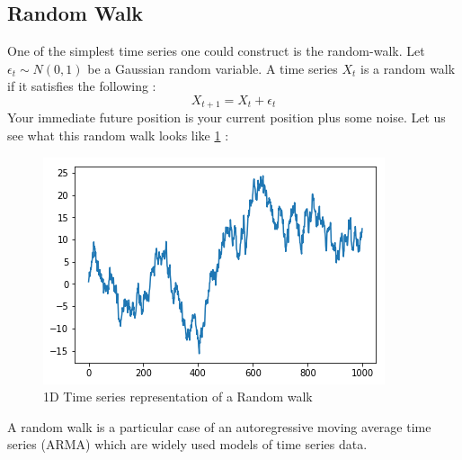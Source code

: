 \documentclass{article}
\begin{document}
\subsection{Random Walk}
One of the simplest time series one could construct is the random-walk. Let $\epsilon_{t}\sim N(0,1)$  be a Gaussian random variable. A time series $X_t$ is a random walk if it satisfies the following : 
\begin{equation}\label{rwalk}
    X_{t+1}=X_{t}+\epsilon_{t}
\end{equation}
Your immediate future position is your current position plus some noise. Let us see what this random walk looks like \ref{fig:randwalk} : 
\begin{figure}
    \includegraphics[width=\textwidth]{random_walk_1D.png}
    \caption{1D Time series representation of a Random walk}
    \label{fig:randwalk}
\end{figure}
A random walk is a particular case of an autoregressive moving average time series (ARMA) which are widely used models of time series data.
\end{document}
